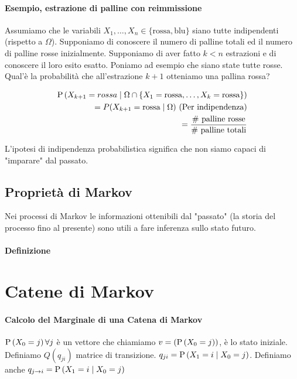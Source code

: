 \paragraph{Esempio, estrazione di palline con reimmissione}

Assumiamo che le variabili $ X_1, \hdots, X_n \in \{\text{rossa}, \text{blu}\} $ siano tutte indipendenti (rispetto a $ \Omega $). Supponiamo di conoscere il numero di palline totali ed il numero di palline rosse inizialmente. Supponiamo di aver fatto $ k < n $ estrazioni e di conoscere il loro esito esatto. Poniamo ad esempio che siano state tutte rosse. Qual'è la probabilità che all'estrazione $ k+1 $ otteniamo una pallina rossa?

\[ \begin{aligned}
\text{P}\left(X_{k+1} = rossa \mid \Omega \cap \{X_1 = \text{rossa}, \hdots, X_k = \text{rossa} \} \right) \\
= P(X_{k+1} = \text{rossa} \mid \Omega)	\text{  (Per indipendenza)} \\
= \dfrac{\text{\# palline rosse}}{\text{\# palline totali}}
\end{aligned} \]

L'ipotesi di indipendenza probabilistica significa che non siamo capaci di "imparare" dal passato.

\subsection{Proprietà di Markov}
Nei processi di Markov le informazioni ottenibili dal "passato" (la storia del processo fino al presente) sono utili a fare inferenza sullo stato futuro.

\paragraph{Definizione}



\section{Catene di Markov}

\paragraph{Calcolo del Marginale di una Catena di Markov}
$ \text{P}\left(X_0 = j\right) \forall j $ è un vettore che chiamiamo $ v = (\text{P}\left(X_0 = j\right)) $, è lo stato iniziale. Definiamo $ Q(q_{ji}) $ matrice di transizione. $ q_{ji} = \text{P}\left(X_1 = i \mid X_0 = j\right) $. Definiamo anche $ q_{j \to i} = \text{P}\left(X_1 = i \mid X_0 = j\right) $

